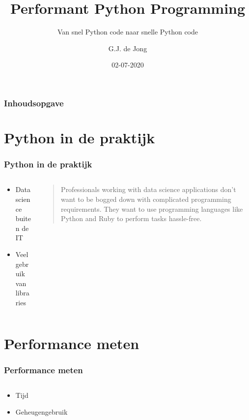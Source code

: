 \documentclass[aspectratio=169]{beamer}
\title{Performant Python Programming}
\subtitle{Van snel Python code naar snelle Python code}
\author{G.J. de Jong}
\date{02-07-2020}
\begin{document}
\frame{\titlepage}

\begin{frame}
  \frametitle{Inhoudsopgave}
  \tableofcontents
\end{frame}

\section{Python in de praktijk}
\begin{frame}
  \frametitle{Python in de praktijk}
  \begin{columns}
    \begin{column}{0.4\textwidth}
      \begin{itemize}
        \item Data science buiten de IT
        \item Veel gebruik van libraries
      \end{itemize}
    \end{column}
    \begin{column}{0.7\textwidth}
      \begin{quote}
        Professionals working with data science applications don’t want to be bogged down with complicated programming requirements.
        They want to use programming languages like Python and Ruby to perform tasks hassle-free.
      \end{quote}
    \end{column}
  \end{columns}
\end{frame}

\section{Performance meten}
\begin{frame}
  \frametitle{Performance meten}
  \begin{columns}
    \begin{column}{0.5\textwidth}
      \begin{itemize}
        \item Tijd
        \item Geheugengebruik
      \end{itemize}
    \end{column}
    \begin{column}{0.5\textwidth}
    \end{column}
  \end{columns}
\end{frame}
\end{document}
